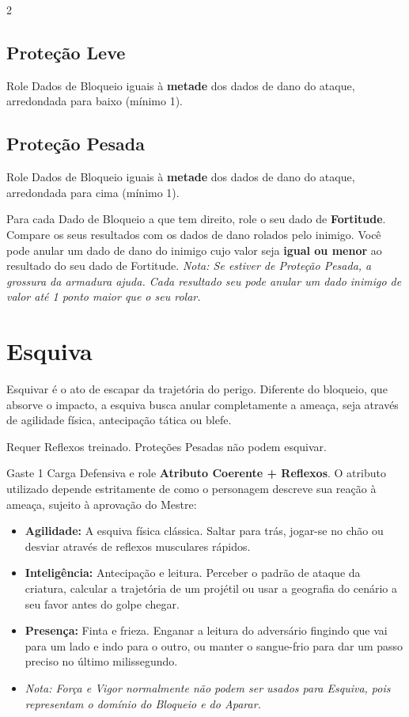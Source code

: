 \documentclass[a4paper,11pt,openany]{book}
\begin{document}
\begin{multicols}{2}
\subsection*{Proteção Leve}
Role Dados de Bloqueio iguais à \textbf{metade} dos dados de dano do ataque, arredondada para baixo (mínimo 1).

\subsection*{Proteção Pesada}
Role Dados de Bloqueio iguais à \textbf{metade} dos dados de dano do ataque, arredondada para cima (mínimo 1).

Para cada Dado de Bloqueio a que tem direito, role o seu dado de \textbf{Fortitude}. Compare os seus resultados com os dados de dano rolados pelo inimigo.
Você pode anular um dado de dano do inimigo cujo valor seja \textbf{igual ou menor} ao resultado do seu dado de Fortitude. 
\textit{Nota: Se estiver de Proteção Pesada, a grossura da armadura ajuda. Cada resultado seu pode anular um dado inimigo de valor até 1 ponto maior que o seu rolar.}

\section{Esquiva}

Esquivar é o ato de escapar da trajetória do perigo. Diferente do bloqueio, que absorve o impacto, a esquiva busca anular completamente a ameaça, seja através de agilidade física, antecipação tática ou blefe.

\begin{regra}
Requer Reflexos treinado. Proteções Pesadas não podem esquivar.
\end{regra}

Gaste 1 Carga Defensiva e role \textbf{Atributo Coerente + Reflexos}. O atributo utilizado depende estritamente de como o personagem descreve sua reação à ameaça, sujeito à aprovação do Mestre:

\begin{itemize}
    \item \textbf{Agilidade:} A esquiva física clássica. Saltar para trás, jogar-se no chão ou desviar através de reflexos musculares rápidos.
    \item \textbf{Inteligência:} Antecipação e leitura. Perceber o padrão de ataque da criatura, calcular a trajetória de um projétil ou usar a geografia do cenário a seu favor antes do golpe chegar.
    \item \textbf{Presença:} Finta e frieza. Enganar a leitura do adversário fingindo que vai para um lado e indo para o outro, ou manter o sangue-frio para dar um passo preciso no último milissegundo.
    \item \textit{Nota: Força e Vigor normalmente não podem ser usados para Esquiva, pois representam o domínio do Bloqueio e do Aparar.
    }
\end{itemize}


\end{multicols}
\end{document}
